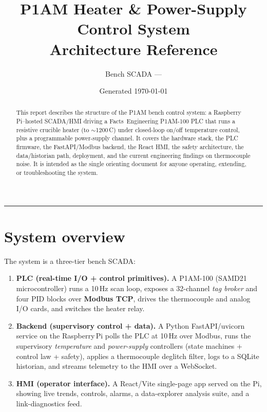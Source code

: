 \documentclass[11pt]{article}
\title{\textbf{P1AM Heater \& Power-Supply Control System}\\[2pt]
\large Architecture Reference}
\author{Bench SCADA --- \code{src/p1am\_control\_system}}
\date{Generated \today}
\begin{document}
\maketitle
\begin{abstract}
\noindent This report describes the structure of the P1AM bench control system: a
Raspberry\,Pi--hosted SCADA/HMI driving a Facts~Engineering P1AM-100 PLC that runs
a resistive crucible heater (to $\sim$1200\,\textdegree C) under closed-loop
on/off temperature control, plus a programmable power-supply channel. It covers
the hardware stack, the PLC firmware, the FastAPI/Modbus backend, the React HMI,
the safety architecture, the data/historian path, deployment, and the current
engineering findings on thermocouple noise. It is intended as the single
orienting document for anyone operating, extending, or troubleshooting the system.
\end{abstract}

\tableofcontents
\bigskip
\hrule

\section{System overview}
The system is a three-tier bench SCADA:

\begin{enumerate}[nosep]
  \item \textbf{PLC (real-time I/O + control primitives).} A P1AM-100 (SAMD21
  microcontroller) runs a 10\,Hz scan loop, exposes a 32-channel \emph{tag broker}
  and four PID blocks over \textbf{Modbus TCP}, drives the thermocouple and analog
  I/O cards, and switches the heater relay.
  \item \textbf{Backend (supervisory control + data).} A Python FastAPI/uvicorn
  service on the Raspberry\,Pi polls the PLC at 10\,Hz over Modbus, runs the
  supervisory \emph{temperature} and \emph{power-supply} controllers (state
  machines + control law + safety), applies a thermocouple deglitch filter,
  logs to a SQLite historian, and streams telemetry to the HMI over a WebSocket.
  \item \textbf{HMI (operator interface).} A React/Vite single-page app served on
  the Pi, showing live trends, controls, alarms, a data-explorer analysis suite,
  and a link-diagnostics feed.
\end{enumerate}
\end{document}

